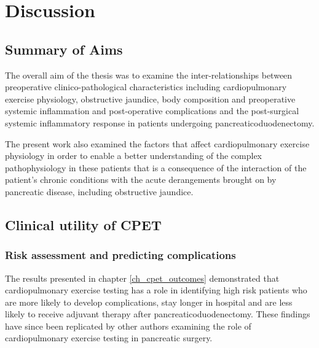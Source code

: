 
\chapter{Discussion}
\label{ch_discussion}


\clearpage
\section{Summary of Aims}

The overall aim of the thesis was to examine the inter-relationships between preoperative clinico-pathological characteristics including cardiopulmonary exercise physiology, obstructive jaundice, body composition and preoperative systemic inflammation and post-operative complications and the post-surgical systemic inflammatory response in patients undergoing pancreaticoduodenectomy.

The present work also examined the factors that affect cardiopulmonary exercise physiology in order to enable a better understanding of the complex pathophysiology in these patients that is a consequence of the interaction of the patient's chronic conditions with the acute derangements brought on by pancreatic disease, including obstructive jaundice.

\clearpage

\section{Clinical utility of CPET}

\subsection{Risk assessment and predicting complications}

The results presented in chapter \ref{ch_cpet_outcomes} demonstrated that cardiopulmonary exercise testing has a role in identifying high risk patients who are more likely to develop complications, stay longer in hospital and are less likely to receive adjuvant therapy after pancreaticoduodenectomy. 
These findings have since been replicated by other authors examining the role of cardiopulmonary exercise testing in pancreatic surgery. 

